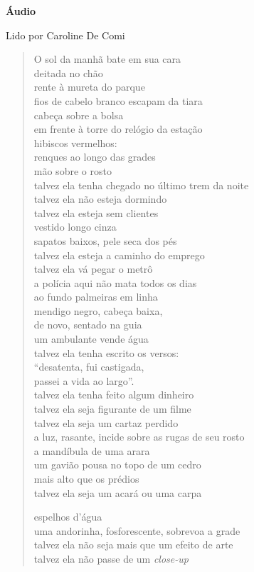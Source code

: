 \pagebreak

\textbf{Áudio}

Lido por Caroline De Comi

\begin{verse}
O sol da manhã bate em sua cara\\
deitada no chão\\
rente à mureta do parque\\
fios de cabelo branco escapam da tiara\\[5pt]
cabeça sobre a bolsa\\
em frente à torre do relógio da estação\\
hibiscos vermelhos:\\
renques ao longo das grades\\[5pt]
mão sobre o rosto\\
talvez ela tenha chegado no último trem da noite\\
talvez ela não esteja dormindo\\
talvez ela esteja sem clientes\\[5pt]
vestido longo cinza\\
sapatos baixos, pele seca dos pés\\
talvez ela esteja a caminho do emprego\\
talvez ela vá pegar o metrô\\[5pt]
a polícia aqui não mata todos os dias\\
ao fundo palmeiras em linha\\
mendigo negro, cabeça baixa,\\
de novo, sentado na guia\\[5pt]
um ambulante vende água\\
talvez ela tenha escrito os versos:\\
``desatenta, fui castigada,\\
passei a vida ao largo''.\\[5pt]
talvez ela tenha feito algum dinheiro\\
talvez ela seja figurante de um filme\\
talvez ela seja um cartaz perdido\\
a luz, rasante, incide sobre as rugas de seu rosto\\[5pt]
a mandíbula de uma arara\\
um gavião pousa no topo de um cedro\\
mais alto que os prédios\\
talvez ela seja um acará ou uma carpa\\[5pt]

\pagebreak

espelhos d'água\\
uma andorinha, fosforescente, sobrevoa a grade\\
talvez ela não seja mais que um efeito de arte\\
talvez ela não passe de um \emph{close-up}
\end{verse}

